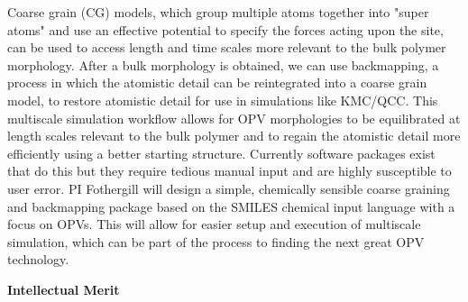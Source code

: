 Coarse grain (CG) models, which group multiple atoms together into "super atoms" and use an effective potential to specify the forces acting upon the site, can be used to access length and time scales more relevant to the bulk polymer morphology.
After a bulk morphology is obtained, we can use backmapping, a process in which the atomistic detail can be reintegrated into a coarse grain model, to restore atomistic detail for use in simulations like KMC/QCC.
This multiscale simulation workflow allows for OPV morphologies to be equilibrated at length scales relevant to the bulk polymer and to regain the atomistic detail more efficiently using a better starting structure.
Currently software packages exist that do this but they require tedious manual input and are highly susceptible to user error.
PI Fothergill will design a simple, chemically sensible coarse graining and backmapping package based on the SMILES chemical input language with a focus on OPVs.
This will allow for easier setup and execution of multiscale simulation, which can be part of the process to finding the next great OPV technology.

\begin{center}
    \textbf{Intellectual Merit}
\end{center}

